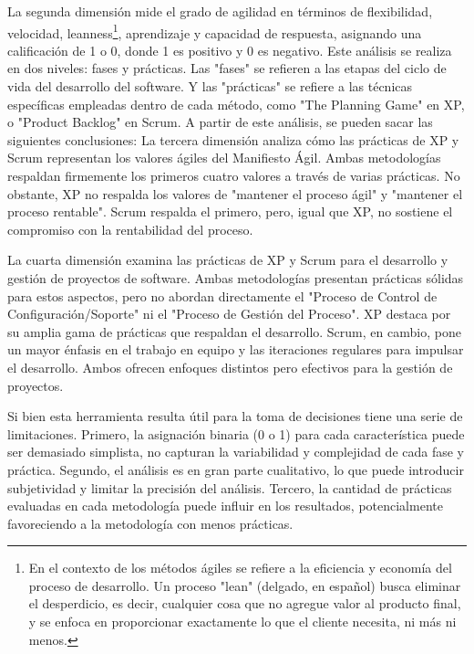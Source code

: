 \documentclass[a4paper,10pt]{article}
\begin{document}
	La segunda dimensión mide el grado de agilidad en términos de flexibilidad, velocidad, leanness\footnote{En el contexto de los métodos ágiles se refiere a la eficiencia y economía del proceso de desarrollo. Un proceso "lean" (delgado, en español) busca eliminar el desperdicio, es decir, cualquier cosa que no agregue valor al producto final, y se enfoca en proporcionar exactamente lo que el cliente necesita, ni más ni menos.}, aprendizaje y capacidad de respuesta, asignando una calificación de 1 o 0, donde 1 es positivo y 0 es negativo. Este análisis se realiza en dos niveles: fases y prácticas. Las "fases" se refieren a las etapas del ciclo de vida del desarrollo del software. Y las "prácticas" se refiere a las técnicas específicas empleadas dentro de cada método, como "The Planning Game" en XP, o "Product Backlog" en Scrum. A partir de este análisis, se pueden sacar las siguientes conclusiones:
	La tercera dimensión analiza cómo las prácticas de XP y Scrum representan los valores ágiles del Manifiesto Ágil. Ambas metodologías respaldan firmemente los primeros cuatro valores a través de varias prácticas. No obstante, XP no respalda los valores de "mantener el proceso ágil" y "mantener el proceso rentable". Scrum respalda el primero, pero, igual que XP, no sostiene el compromiso con la rentabilidad del proceso.
	
	La cuarta dimensión examina las prácticas de XP y Scrum para el desarrollo y gestión de proyectos de software. Ambas metodologías presentan prácticas sólidas para estos aspectos, pero no abordan directamente el "Proceso de Control de Configuración/Soporte" ni el "Proceso de Gestión del Proceso". XP destaca por su amplia gama de prácticas que respaldan el desarrollo. Scrum, en cambio, pone un mayor énfasis en el trabajo en equipo y las iteraciones regulares para impulsar el desarrollo. Ambos ofrecen enfoques distintos pero efectivos para la gestión de proyectos.
	
	Si bien esta herramienta resulta útil para la toma de decisiones tiene una serie de limitaciones. Primero, la asignación binaria (0 o 1) para cada característica puede ser demasiado simplista, no capturan la variabilidad y complejidad de cada fase y práctica. Segundo, el análisis es en gran parte cualitativo, lo que puede introducir subjetividad y limitar la precisión del análisis. Tercero, la cantidad de prácticas evaluadas en cada metodología puede influir en los resultados, potencialmente favoreciendo a la metodología con menos prácticas.
	
\end{document}
